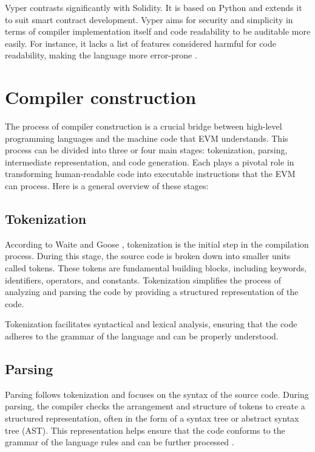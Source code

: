 Vyper contrasts significantly with Solidity. It is based on Python and extends it to suit smart contract development. Vyper aims for security and simplicity in terms of compiler implementation itself and code readability to be auditable more easily. For instance, it lacks a list of features considered harmful for code readability, making the language more error-prone \cite{VyperDescription}.

\section{Compiler construction}
\label{sec:cc}

The process of compiler construction is a crucial bridge between high-level programming languages and the machine code that EVM understands. This process can be divided into three or four main stages: tokenization, parsing, intermediate representation, and code generation. Each plays a pivotal role in transforming human-readable code into executable instructions that the EVM can process. Here is a general overview of these stages:

\subsection{Tokenization}
According to Waite and Goose \cite[135-148]{CompilerConstruction}, tokenization is the initial step in the compilation process. During this stage, the source code is broken down into smaller units called tokens. These tokens are fundamental building blocks, including keywords, identifiers, operators, and constants. Tokenization simplifies the process of analyzing and parsing the code by providing a structured representation of the code.

Tokenization facilitates syntactical and lexical analysis, ensuring that the code adheres to the grammar of the language and can be properly understood.

\subsection{Parsing}

Parsing follows tokenization and focuses on the syntax of the source code. During parsing, the compiler checks the arrangement and structure of tokens to create a structured representation, often in the form of a syntax tree or abstract syntax tree (AST). This representation helps ensure that the code conforms to the grammar of the language rules and can be further processed \cite[149-182]{CompilerConstruction}.

